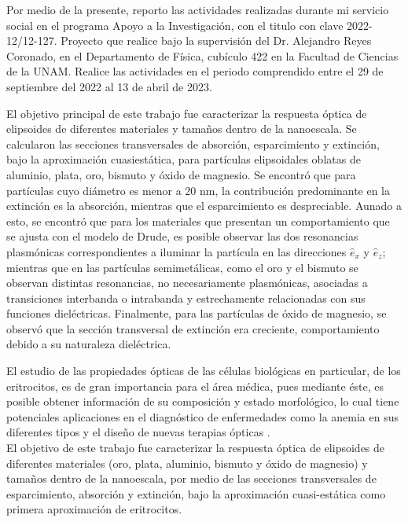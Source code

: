 \documentclass[8.5pt,letterpaper]{article}
\begin{document}
	Por medio de la presente, reporto las actividades realizadas durante mi servicio social en el programa Apoyo a la Investigación, con el titulo  con clave 2022-12/12-127. Proyecto que realice bajo la supervisión del Dr. Alejandro Reyes Coronado, en el Departamento de Física, cubículo 422 en la Facultad de Ciencias de la UNAM. Realice las actividades en el periodo comprendido entre el 29 de septiembre del 2022 al 13
	de abril de 2023.
	
	
	
	El objetivo principal de este trabajo fue caracterizar la respuesta óptica de elipsoides de diferentes materiales y tamaños dentro de la nanoescala. Se calcularon las secciones transversales de absorción, esparcimiento y extinción, bajo la aproximación cuasiestática, para partículas elipsoidales oblatas de aluminio, plata, oro, bismuto y óxido de magnesio. Se encontró que para partículas cuyo diámetro es menor a 20 nm, la contribución predominante en la extinción es la absorción, mientras que el esparcimiento es despreciable. Aunado a esto, se encontró que para los materiales que presentan un comportamiento que se ajusta con el modelo de Drude, es posible observar las dos resonancias plasmónicas correspondientes a iluminar la partícula en las direcciones $\hat{e}_x$ y $\hat{e}_z$; mientras que en las partículas semimetálicas, como el oro y el bismuto se observan distintas resonancias, no necesariamente plasmónicas, asociadas a transiciones interbanda o intrabanda y estrechamente relacionadas con sus funciones dieléctricas. Finalmente, para las partículas de óxido de magnesio, se observó que la sección transversal de extinción era creciente, comportamiento debido a su naturaleza dieléctrica.
	
	El estudio de las propiedades ópticas de las células biológicas en particular, de los eritrocitos, es de gran importancia para el área médica, pues mediante éste, es posible obtener información de su composición y estado morfológico, lo cual tiene potenciales aplicaciones en el diagnóstico de enfermedades como la anemia en sus diferentes tipos y el diseño de nuevas terapias ópticas \cite{Blood}. \\
	
	El objetivo de este trabajo fue caracterizar la respuesta óptica de elipsoides de diferentes materiales (oro, plata, aluminio, bismuto y óxido de magnesio) y tamaños dentro de la nanoescala, por medio de las secciones transversales de esparcimiento, absorción y extinción, bajo la aproximación cuasi-estática como primera aproximación de eritrocitos.
\end{document}
